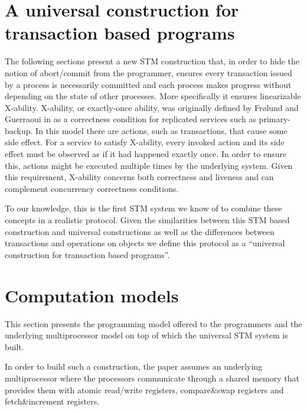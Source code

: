\section{A universal construction for transaction based programs}

The following sections  present a  new STM construction  that,
in order to hide the notion of abort/commit from the programmer, ensures every  
transaction issued by a process is necessarily committed and  each process 
makes progress without depending on the state of other processes.
More specifically it ensures linearizable X-ability.
X-ability, or exactly-once ability, was originally defined 
by Fr{\o}lund and Guerraoui in \cite{FG01}
as a correctness condition for replicated services such as
primary-backup.  In this model there are actions, such as
transactions, that cause some side effect.  For a service to satisfy
X-ability, every invoked action and its side effect must be observed as
if it had happened exactly once.  In order to ensure this, actions
might be executed multiple times by the underlying system.  Given this
requirement, X-ability concerns both correctness and liveness and can
complement concurrency correctness conditions.

To  our knowledge,  this  is the  first STM  system 
we  know of  to combine  these concepts in a realistic protocol.
Given the similarities between this STM based construction and universal
constructions as well as the differences between transactions and operations on objects
we define this protocol as a ``universal construction for transaction based programs''.


\section{Computation models}
\label{sec:models}

This section presents the programming model offered to the programmers
and  the underlying  multiprocessor model on top of which  the universal STM 
system is built. 

In order to build such a construction, the paper assumes an underlying 
multiprocessor where the processors  communicate through 
a shared memory that provides them with atomic read/write registers, 
compare\&swap registers and fetch\&increment registers. 

